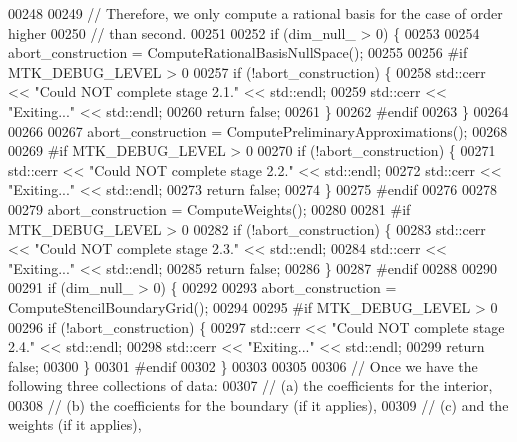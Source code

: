 \begin{DoxyCode}
{{00248 
00249   \textcolor{comment}{// Therefore, we only compute a rational basis for the case of order higher}
00250   \textcolor{comment}{// than second.}
00251 
00252   \textcolor{keywordflow}{if} (dim\_null\_ > 0) \{
00253 
00254     abort\_construction = ComputeRationalBasisNullSpace();
00255 
00256 \textcolor{preprocessor}{    #if MTK\_DEBUG\_LEVEL > 0}
00257     \textcolor{keywordflow}{if} (!abort\_construction) \{
00258       std::cerr << \textcolor{stringliteral}{"Could NOT complete stage 2.1."} << std::endl;
00259       std::cerr << \textcolor{stringliteral}{"Exiting..."} << std::endl;
00260       \textcolor{keywordflow}{return} \textcolor{keyword}{false};
00261     \}
00262 \textcolor{preprocessor}{    #endif}
00263   \}
00264 
00266 
00267   abort\_construction = ComputePreliminaryApproximations();
00268 
00269 \textcolor{preprocessor}{  #if MTK\_DEBUG\_LEVEL > 0}
00270   \textcolor{keywordflow}{if} (!abort\_construction) \{
00271     std::cerr << \textcolor{stringliteral}{"Could NOT complete stage 2.2."} << std::endl;
00272     std::cerr << \textcolor{stringliteral}{"Exiting..."} << std::endl;
00273     \textcolor{keywordflow}{return} \textcolor{keyword}{false};
00274   \}
00275 \textcolor{preprocessor}{  #endif}
00276 
00278 
00279   abort\_construction = ComputeWeights();
00280 
00281 \textcolor{preprocessor}{  #if MTK\_DEBUG\_LEVEL > 0}
00282   \textcolor{keywordflow}{if} (!abort\_construction) \{
00283     std::cerr << \textcolor{stringliteral}{"Could NOT complete stage 2.3."} << std::endl;
00284     std::cerr << \textcolor{stringliteral}{"Exiting..."} << std::endl;
00285     \textcolor{keywordflow}{return} \textcolor{keyword}{false};
00286   \}
00287 \textcolor{preprocessor}{  #endif}
00288 
00290 
00291   \textcolor{keywordflow}{if} (dim\_null\_ > 0) \{
00292 
00293     abort\_construction = ComputeStencilBoundaryGrid();
00294 
00295 \textcolor{preprocessor}{    #if MTK\_DEBUG\_LEVEL > 0}
00296     \textcolor{keywordflow}{if} (!abort\_construction) \{
00297       std::cerr << \textcolor{stringliteral}{"Could NOT complete stage 2.4."} << std::endl;
00298       std::cerr << \textcolor{stringliteral}{"Exiting..."} << std::endl;
00299       \textcolor{keywordflow}{return} \textcolor{keyword}{false};
00300     \}
00301 \textcolor{preprocessor}{    #endif}
00302   \}
00303 
00305 
00306   \textcolor{comment}{// Once we have the following three collections of data:}
00307   \textcolor{comment}{//   (a) the coefficients for the interior,}
00308   \textcolor{comment}{//   (b) the coefficients for the boundary (if it applies),}
00309   \textcolor{comment}{//   (c) and the weights (if it applies),}
}}
\end{DoxyCode}
